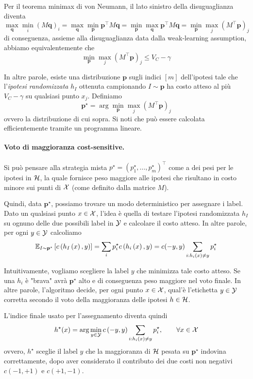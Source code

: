 Per il teorema minimax di von Neumann, il lato sinistro della disuguaglianza diventa
$$  \max_{\bm q} \min_i \left(M \bm q\right)_i = \max_{\bm q} \min_{\bm p} \bm p^\top M \bm q = \min_{\bm p} \max_{\bm q} \bm p^\top M \bm q = \min_{\bm p} \max_j \left(M^\top \bm p\right)_j $$
di conseguenza, assieme alla disuguaglianza data dalla weak-learning assumption, abbiamo equivalentemente che
$$ \min_{\bm p} \max_j \left(M^\top \bm p\right)_j \leq V_C - \gamma $$

In altre parole, esiste una distribuzione $\bm p$ sugli indici $[m]$ dell'ipotesi tale che l'\textit{ipotesi randomizzata} $h_I$ ottenuta campionando $I \sim \bm p$ ha costo atteso al più $V_C - \gamma$ su qualsiasi punto $x_j$. Definiamo
\[
\bm p^\star = \arg \min_{\bm p} \max_j \left(M^\top \bm p\right)_j \tag*{$(\dag)$}
\]
ovvero la distribuzione di cui sopra. Si noti che può essere calcolata efficientemente tramite un programma lineare.

\paragraph{Voto di maggioranza cost-sensitive.} Si può pensare alla strategia mista $p^\star = \left(p^\star_1, \dots, p^\star_m \right)^\top$ come a dei pesi per le ipotesi in $\mathcal{H}$, la quale fornisce peso maggiore alle ipotesi che risultano in costo minore sui punti di $\mathcal{X}$ (come definito dalla matrice $M$).

Quindi, data $\bm p^\star$, possiamo trovare un modo deterministico per assegnare i label. Dato un qualsiasi punto $x \in \mathcal{X}$, l'idea è quella di testare l'ipotesi randomizzata $h_I$ su ognuno delle due possibili label in $\mathcal{Y}$ e calcolare il costo atteso. In altre parole, per ogni $y \in \mathcal{Y}$ calcoliamo
$$ \mathbb{E}_{I \sim \bm p^\star} \left[c \left(h_I \left(x\right), y\right)\right] = \sum_i p_i^\star c \left(h_i \left(x\right), y\right) = c (-y, y) \sum_{i: h_i (x) \neq y} p_i^\star $$

Intuitivamente, vogliamo scegliere la label $y$ che minimizza tale costo atteso. Se una $h_i$ è "brava" avrà $\bm p^\star$ alto e di conseguenza peso maggiore nel voto finale. In altre parole, l'algoritmo decide, per ogni punto $x \in \mathcal{X}$, qual'è l'etichetta $y \in \mathcal{Y}$ corretta secondo il voto della maggioranza delle ipotesi $h \in \mathcal{H}$.

L'indice finale usato per l'assegnamento diventa quindi
$$ h^\star (x) = \arg \min_{y \in \mathcal{Y}} c \left(-y, y\right) \sum_{i: h_i (x) \neq y} p_i^\star, \qquad \forall x \in \mathcal{X} $$
ovvero, $h^\star$ sceglie il label $y$ che la maggioranza di $\mathcal{H}$ pesata su $\bm p^\star$ indovina correttamente, dopo aver considerato il contributo dei due costi non negativi $c(-1, +1)$ e $c(+1, -1)$.

